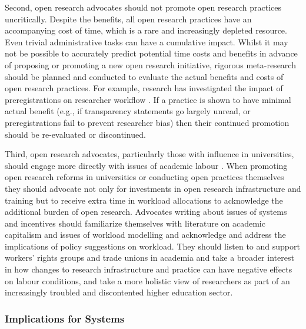 \documentclass[meta, authordate]{jote-new-article}
\begin{document}
Second, open research advocates should not promote open research practices uncritically. Despite the benefits, all open research practices have an accompanying cost of time, which is a rare and increasingly depleted resource. Even trivial administrative tasks can have a cumulative impact. Whilst it may not be possible to accurately predict potential time costs and benefits in advance of proposing or promoting a new open research initiative, rigorous meta-research should be planned and conducted to evaluate the actual benefits and costs of open research practices. For example, research has investigated the impact of preregistrations on researcher workflow \parencites{Sarafoglou2022}. If a practice is shown to have minimal actual benefit (e.g., if transparency statements go largely unread, or preregistrations fail to prevent researcher bias) then their continued promotion should be re-evaluated or discontinued.



Third, open research advocates, particularly those with influence in universities, should engage more directly with issues of academic labour \parencites{Callard2022}{Hostler2022}. When promoting open research reforms in universities or conducting open practices themselves they should advocate not only for investments in open research infrastructure and training but to receive extra time in workload allocations to acknowledge the additional burden of open research. Advocates writing about issues of systems and incentives should familiarize themselves with literature on academic capitalism \parencites{Jessop2018} and issues of workload modelling \parencites{Papadopoulos2017} and acknowledge and address the implications of policy suggestions on workload. They should listen to and support workers’ rights groups and trade unions in academia and take a broader interest in how changes to research infrastructure and practice can have negative effects on labour conditions, and take a more holistic view of researchers as part of an increasingly troubled and discontented higher education sector.



\subsubsection{Implications for Systems}
\end{document}
